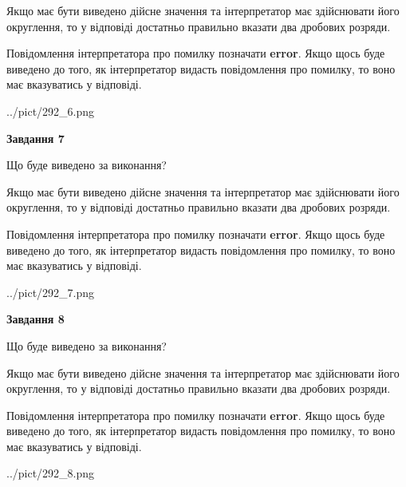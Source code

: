 \documentclass[12pt, ukrainian]{article}
\begin{document}
{\begin {Large}
Якщо має бути виведено дійсне значення та інтерпретатор має здійснювати його округлення, 
то у відповіді достатньо правильно вказати два дробових розряди.

Повідомлення інтерпретатора про помилку позначати \textbf{error}.
Якщо щось буде виведено до того, як інтерпретатор видасть повідомлення про помилку, 
то воно має вказуватись у відповіді. \par

\begin{center}
	{../pict/292_6.png}
\end{center}
\newpage

{\begin {center}\textbf{Завдання 7}\end {center}}\par
Що буде виведено за виконання? \par

Якщо має бути виведено дійсне значення та інтерпретатор має здійснювати його округлення, 
то у відповіді достатньо правильно вказати два дробових розряди.

Повідомлення інтерпретатора про помилку позначати \textbf{error}.
Якщо щось буде виведено до того, як інтерпретатор видасть повідомлення про помилку, 
то воно має вказуватись у відповіді. \par

\begin{center}
	{../pict/292_7.png}
\end{center}
\newpage

{\begin {center}\textbf{Завдання 8}\end {center}}\par
Що буде виведено за виконання? \par

Якщо має бути виведено дійсне значення та інтерпретатор має здійснювати його округлення, 
то у відповіді достатньо правильно вказати два дробових розряди.

Повідомлення інтерпретатора про помилку позначати \textbf{error}.
Якщо щось буде виведено до того, як інтерпретатор видасть повідомлення про помилку, 
то воно має вказуватись у відповіді. \par

\begin{center}
	{../pict/292_8.png}
\end{center}
\newpage


\end{Large}}
\end{document}
